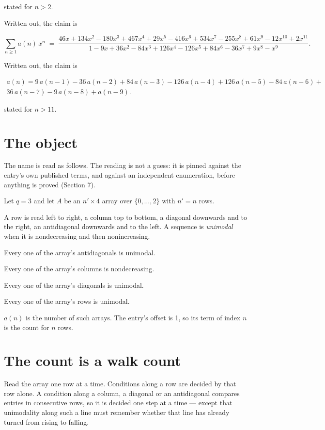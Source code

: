 \documentclass[11pt]{article}
\theoremstyle{definition}
\begin{document}
stated for $n > 2$.

Written out, the claim is

\[\sum_{n \ge 1} a(n)\,x^n \;=\; \frac{46x + 134x^{2} - 180x^{3} + 467x^{4} + 29x^{5} - 416x^{6} + 534x^{7} - 255x^{8} + 61x^{9} - 12x^{10} + 2x^{11}}{1 - 9x + 36x^{2} - 84x^{3} + 126x^{4} - 126x^{5} + 84x^{6} - 36x^{7} + 9x^{8} - x^{9}}.\]

Written out, the claim is

\begin{multline*} a(n) = 9\,a(n-1) - 36\,a(n-2) + 84\,a(n-3) - 126\,a(n-4) + 126\,a(n-5) - 84\,a(n-6) + \\ 36\,a(n-7) - 9\,a(n-8) + a(n-9). \end{multline*}

stated for $n > 11$.

\section{The object}

The name is read as follows. The reading is not a guess: it is pinned against the entry's own published terms, and against an independent enumeration, before anything is proved (Section 7).

Let $q = 3$ and let $A$ be an $n' \times 4$ array over $\{0,\dots,2\}$ with $n' = n$ rows.

A row is read left to right, a column top to bottom, a diagonal downwards and to the right, an antidiagonal downwards and to the left. A sequence is {\itshape unimodal} when it is nondecreasing and then nonincreasing.

Every one of the array's antidiagonals is unimodal.

Every one of the array's columns is nondecreasing.

Every one of the array's diagonals is unimodal.

Every one of the array's rows is unimodal.

$a(n)$ is the number of such arrays. The entry's offset is 1, so its term of index $n$ is the count for $n$ rows.

\section{The count is a walk count}

Read the array one row at a time. Conditions along a row are decided by that row alone. A condition along a column, a diagonal or an antidiagonal compares entries in consecutive rows, so it is decided one step at a time --- except that unimodality along such a line must remember whether that line has already turned from rising to falling.
\end{document}
